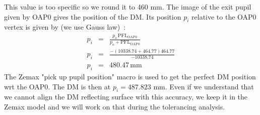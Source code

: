 \documentclass[12pt,a4paper]{article}
\begin{document}
This value is too specific so we round it to 460 mm. The image of the exit pupil given by OAP0 gives the position of the DM. Its position $p_i$ relative to the OAP0 vertex is given by (we use Gauss law)~:
\begin{eqnarray}
	p_i &= &\frac{p_o\,\text{PFL}_{\text{OAP0}}}{p_o+\text{PFL}_{\text{OAP0}}}\\
	p_i &= &\frac{-(10338.74+464.77)464.77}{-10338.74}\\
	p_i &= &480.47\,\text{mm}
\end{eqnarray}
The Zemax "pick up pupil position" macro is used to get the perfect DM position wrt the OAP0. The DM is then at $p_i = 487.823$ mm. Even if we understand that we cannot align the DM reflecting surface with this accuracy, we keep it in the Zemax model  and we will work on that during the tolerancing analysis. 
\end{document}
